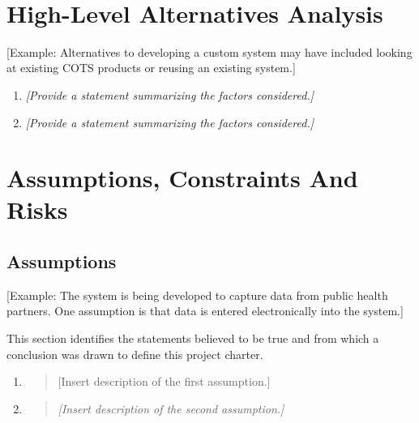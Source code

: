 \emph{\\
}

\hypertarget{high-level-alternatives-analysis}{%
\section{High-Level Alternatives
Analysis}\label{high-level-alternatives-analysis}}

{[}Example: Alternatives to developing a custom system may have included
looking at existing COTS products or reusing an existing system.{]}

\begin{enumerate}
\def\labelenumi{\arabic{enumi}.}
\item
  \emph{{[}Provide a statement summarizing the factors considered.{]}}
\item
  \emph{{[}Provide a statement summarizing the factors considered.{]}}
\end{enumerate}

\hypertarget{assumptions-constraints-and-risks}{%
\section{Assumptions, Constraints And
Risks}\label{assumptions-constraints-and-risks}}

\hypertarget{assumptions}{%
\subsection{Assumptions}\label{assumptions}}

{[}Example: The system is being developed to capture data from public
health partners. One assumption is that data is entered electronically
into the system.{]}

This section identifies the statements believed to be true and from
which a conclusion was drawn to define this project charter.

\begin{enumerate}
\def\labelenumi{\arabic{enumi}.}
\item
  \begin{quote}
  {[}Insert description of the first assumption.{]}
  \end{quote}
\item
  \begin{quote}
  \emph{{[}Insert description of the second assumption.{]}}
  \end{quote}
\end{enumerate}

